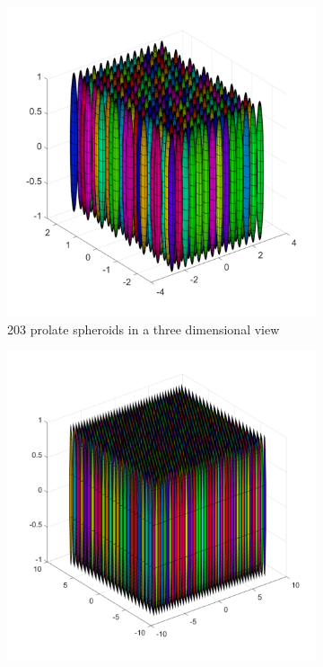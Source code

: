 \begin{figure}
        \centering
        \begin{subfigure}[b]{0.475\textwidth}
            \centering
            \includegraphics[width=\textwidth]{Images/Rods/SmallRods3d.pdf}
            \caption[]%
            {{\small 203 prolate spheroids in a three dimensional view}}    
            \label{fig:mean and std of net14}
        \end{subfigure}
        \begin{subfigure}[b]{0.475\textwidth}  
            \centering 
            \includegraphics[width=\textwidth]{Images/Rods/LargeRods3d.pdf}

\end{subfigure}
\end{figure}
